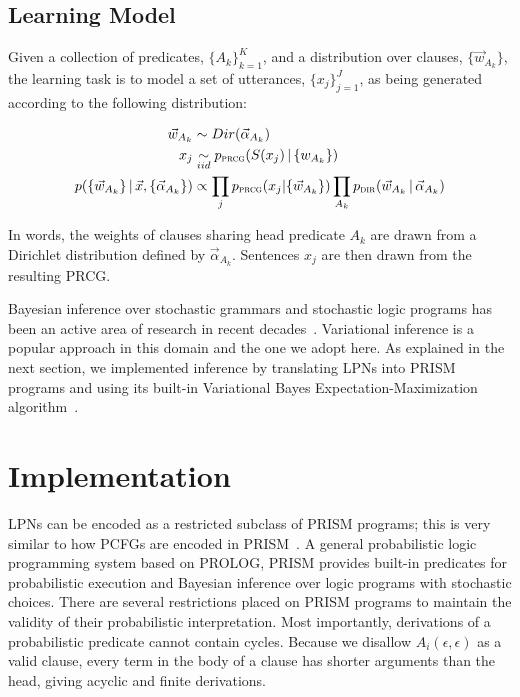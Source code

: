 \documentclass{article} %
\begin{document}
\subsection{Learning Model}

Given a collection of predicates, $\{A_k\}_{k=1}^{K}$, and a
distribution over clauses, $\{\vec{w}_{A_k}\}$, the learning task is
to model a set of utterances, $\{x_j\}_{j=1}^{J}$, as being generated
according to the following distribution:

\begin{align*}
  \vec{w}_{A_k} &\sim Dir(\vec{\alpha}_{A_k})\\
  x_j &\underset{iid}{\sim} p_{\text{\textsc{prcg}}}(S(x_j)\,|\,\{w_{A_k}\})\\
  p(\{\vec{w}_{A_k}\}\,|\, \vec{x}, \{\vec{\alpha}_{A_k}\}) &\propto
  \prod_j p_{\text{\textsc{prcg}}}(x_j|\{\vec{w}_{A_k}\}) \prod_{A_k}
  p_{\text{\textsc{dir}}}(\vec{w}_{A_k}\,|\,\vec{\alpha}_{A_k})
\end{align*}


In words, the weights of clauses sharing head predicate $A_k$ are
drawn from a Dirichlet distribution defined by
$\vec{\alpha}_{A_k}$. Sentences $x_j$ are then drawn from the
resulting PRCG.

Bayesian inference over stochastic grammars
and stochastic logic programs has been an active area of
research in recent decades~\cite{DBLP:journals/etai/Muggleton00, cussens2001parameter, DBLP:conf/emnlp/LiangPJK07,
  goldwater2006contextual, johnson2006adaptor}.
Variational inference is a popular approach in this domain and the one
we adopt here. As explained in the next section, we implemented
inference by translating LPNs into PRISM programs and using its
built-in Variational Bayes Expectation-Maximization
algorithm~\cite{sato2008variational}. 

\section{Implementation \label{sec:implementation}}

LPNs can be encoded as a restricted subclass of PRISM programs; this
is very similar to how PCFGs are encoded in
PRISM~\cite{DBLP:conf/cl/2000}. A general probabilistic logic
programming system based on PROLOG, PRISM provides built-in predicates
for probabilistic execution and Bayesian inference over logic programs
with stochastic choices. There are several restrictions placed on
PRISM programs to maintain the validity of their probabilistic
interpretation. Most importantly, derivations of a probabilistic
predicate cannot contain cycles. Because we disallow
$A_i(\epsilon,\epsilon)$ as a valid clause, every term in the body of
a clause has shorter arguments than the head, giving acyclic and
finite derivations.
\end{document}
